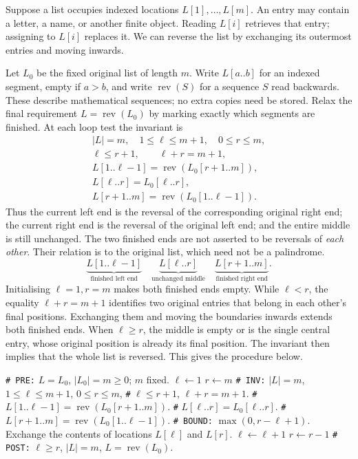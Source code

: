 Suppose a list occupies indexed locations $L[1],\ldots,L[m]$. An entry
may contain a letter, a name, or another finite object. Reading $L[i]$
retrieves that entry; assigning to $L[i]$ replaces it. We can reverse the
list by exchanging its outermost entries and moving inwards.

Let $L_0$ be the fixed original list of length $m$. Write $L[a..b]$
for an indexed segment, empty if $a>b$, and write $\operatorname{rev}(S)$
for a sequence $S$ read backwards. These describe mathematical sequences;
no extra copies need be stored. Relax the final requirement
$L=\operatorname{rev}(L_0)$ by marking exactly which segments are finished.
At each loop test the invariant is
\[
\begin{gathered}
|L|=m,\quad 1\leq\ell\leq m+1,\quad 0\leq r\leq m,\\
\ell\leq r+1,\qquad \ell+r=m+1,\\
L[1..\ell-1]=\operatorname{rev}(L_0[r+1..m]),\\
L[\ell..r]=L_0[\ell..r],\\
L[r+1..m]=\operatorname{rev}(L_0[1..\ell-1]).
\end{gathered}
\]
Thus the current left end is the reversal of the corresponding original
right end; the current right end is the reversal of the original left end;
and the entire middle is still unchanged. The two finished ends are not
asserted to be reversals of \emph{each other}. Their relation is to the
original list, which need not be a palindrome.
\[
\underbrace{L[1..\ell-1]}_{\text{finished left end}}\quad
\underbrace{L[\ell..r]}_{\text{unchanged middle}}\quad
\underbrace{L[r+1..m]}_{\text{finished right end}}.
\]
Initialising $\ell=1,r=m$ makes both finished ends empty. While $\ell<r$,
the equality $\ell+r=m+1$ identifies two original entries that belong
in each other's final positions. Exchanging them and moving the boundaries
inwards extends both finished ends. When $\ell\geq r$, the middle is
empty or is the single central entry, whose original position is already
its final position. The invariant then implies that the whole list is
reversed. This gives the procedure below.

\begin{algorithm}[H]
\begin{algorithmic}[1]
\Statex \texttt{\# PRE:} $L=L_0$, $|L_0|=m\geq0$; $m$ fixed.
\State $\ell\leftarrow1$
\State $r\leftarrow m$
\Statex \texttt{\# INV:} $|L|=m$, $1\leq\ell\leq m+1$, $0\leq r\leq m$,
\Statex \texttt{\#} $\ell\leq r+1$, $\ell+r=m+1$.
\Statex \texttt{\#} $L[1..\ell-1]=\operatorname{rev}(L_0[r+1..m])$.
\Statex \texttt{\#} $L[\ell..r]=L_0[\ell..r]$.
\Statex \texttt{\#} $L[r+1..m]=\operatorname{rev}(L_0[1..\ell-1])$.
\Statex \texttt{\# BOUND:} $\max(0,r-\ell+1)$.
\State Exchange the contents of locations $L[\ell]$ and $L[r]$.
\State $\ell\leftarrow\ell+1$
\State $r\leftarrow r-1$
\EndWhile
\Statex \texttt{\# POST:} $\ell\geq r$, $|L|=m$, $L=\operatorname{rev}(L_0)$.
\EndProcedure
\end{algorithmic}
\caption{Reverse a list by modifying its entries.}
\end{algorithm}

